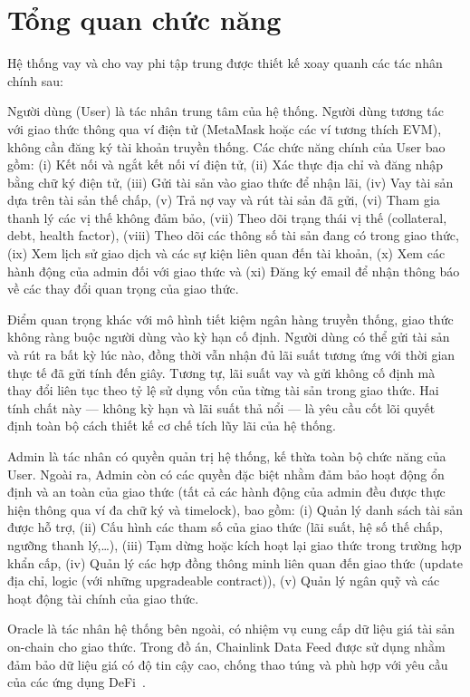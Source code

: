 \documentclass[../DoAn.tex]{subfiles}
\begin{document}
\section{Tổng quan chức năng}


Hệ thống vay và cho vay phi tập trung được thiết kế xoay quanh các tác nhân chính sau:

Người dùng (User) là tác nhân trung tâm của hệ thống. Người dùng tương tác với giao thức thông qua ví điện tử (MetaMask hoặc các ví tương thích EVM), không cần đăng ký tài khoản truyền thống. Các chức năng chính của User bao gồm: (i) Kết nối và ngắt kết nối ví điện tử, (ii) Xác thực địa chỉ và đăng nhập bằng chữ ký điện tử, (iii) Gửi tài sản vào giao thức để nhận lãi, (iv) Vay tài sản dựa trên tài sản thế chấp, (v) Trả nợ vay và rút tài sản đã gửi, (vi) Tham gia thanh lý các vị thế không đảm bảo, (vii) Theo dõi trạng thái vị thế (collateral, debt, health factor), (viii) Theo dõi các thông số tài sản đang có trong giao thức, (ix) Xem lịch sử giao dịch và các sự kiện liên quan đến tài khoản, (x) Xem các hành động của admin đối với giao thức và (xi) Đăng ký email để nhận thông báo về các thay đổi quan trọng của giao thức.

Điểm quan trọng khác với mô hình tiết kiệm ngân hàng truyền thống, giao thức không ràng buộc người dùng vào kỳ hạn cố định. Người dùng có thể gửi tài sản và rút ra bất kỳ lúc nào, đồng thời vẫn nhận đủ lãi suất tương ứng với thời gian thực tế đã gửi tính đến giây. Tương tự, lãi suất vay và gửi không cố định mà thay đổi liên tục theo tỷ lệ sử dụng vốn của từng tài sản trong giao thức. Hai tính chất này --- không kỳ hạn và lãi suất thả nổi --- là yêu cầu cốt lõi quyết định toàn bộ cách thiết kế cơ chế tích lũy lãi của hệ thống.

Admin là tác nhân có quyền quản trị hệ thống, kế thừa toàn bộ chức năng của User. Ngoài ra, Admin còn có các quyền đặc biệt nhằm đảm bảo hoạt động ổn định và an toàn của giao thức (tất cả các hành động của admin đều được thực hiện thông qua ví đa chữ ký và timelock), bao gồm: (i) Quản lý danh sách tài sản được hỗ trợ, (ii) Cấu hình các tham số của giao thức (lãi suất, hệ số thế chấp, ngưỡng thanh lý,…), (iii) Tạm dừng hoặc kích hoạt lại giao thức trong trường hợp khẩn cấp, (iv) Quản lý các hợp đồng thông minh liên quan đến giao thức (update địa chỉ, logic (với những upgradeable contract)), (v) Quản lý ngân quỹ và các hoạt động tài chính của giao thức.

Oracle là tác nhân hệ thống bên ngoài, có nhiệm vụ cung cấp dữ liệu giá tài sản on-chain cho giao thức. Trong đồ án, Chainlink Data Feed được sử dụng nhằm đảm bảo dữ liệu giá có độ tin cậy cao, chống thao túng và phù hợp với yêu cầu của các ứng dụng DeFi~\cite{ChainlinkDocs}.
\end{document}
